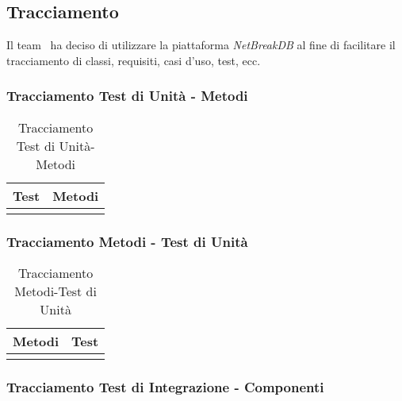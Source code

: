 \subsection{Tracciamento}
Il team \gruppo\ ha deciso di utilizzare la piattaforma \textit{NetBreakDB} al fine di facilitare il tracciamento di classi, requisiti, casi d'uso, test, ecc.

\subsubsection{Tracciamento Test di Unità - Metodi}

\normalsize
\begin{longtable}{|>{\centering}m{5cm}|m{5cm}<{\centering}|}
	\hline \rowcolor{Gray}
	\textbf{Test} & \textbf{Metodi}\\
	\hline
	\endhead
	
	\caption[Tracciamento Test di Unità-Metodi]{Tracciamento Test di Unità-Metodi}
	\label{tabella:tu-metodi}
\end{longtable}
\clearpage

\subsubsection{Tracciamento Metodi - Test di Unità}

\normalsize
\begin{longtable}{|>{\centering}m{5cm}|m{5cm}<{\centering}|}
	\hline \rowcolor{Gray}
	\textbf{Metodi} & \textbf{Test}\\
	\hline
	\endhead
	
	\caption[Tracciamento Metodi-Test di Unità]{Tracciamento Metodi-Test di Unità}
	\label{tabella:metodi-tu}
\end{longtable}
\clearpage

\subsubsection{Tracciamento Test di Integrazione - Componenti}

